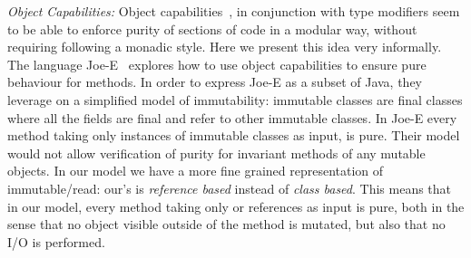 \noindent
\textit{Object Capabilities:}
Object capabilities~\cite{RobustComposition}, in conjunction with type modifiers seem to be able to
 enforce purity of sections of code in a modular way, without requiring following a monadic style.
Here we present this idea very informally.
The language Joe-E~\cite{finifter2008verifiable}
explores how to use object capabilities to ensure
pure behaviour for methods.
In order to express Joe-E as a subset of Java,
they leverage on a simplified model of immutability:
immutable classes are final classes where all the fields are final and refer to other immutable classes.
In Joe-E every method taking only instances of immutable classes as input, is pure.
Their model would not allow verification of purity for invariant methods of any mutable objects.
In our model we have a more fine grained representation of immutable/read:
our’s is \emph{reference based} instead of \emph{class based}.
This means that in our model, every method taking only \Q@read@ or \Q@imm@ references as input is pure,
both in the sense that no object visible outside of the method is mutated, but also
that no I/O is performed.



